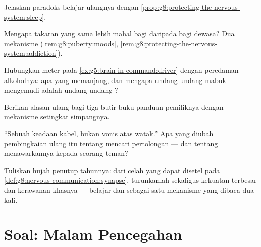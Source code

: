 \begin{exercise}[$\star\star$]\label{exo:g8:protecting-the-nervous-system:7}
Jelaskan paradoks belajar ulangnya dengan
\cref{prop:g8:protecting-the-nervous-system:sleep}.
\end{exercise}

\begin{exercise}[$\star\star$]\label{exo:g8:protecting-the-nervous-system:8}
Mengapa takaran yang sama lebih mahal bagi  
daripada bagi  dewasa? Dua mekanisme
(\cref{rem:g8:puberty:moods},
\cref{rem:g8:protecting-the-nervous-system:addiction}).
\end{exercise}

\begin{exercise}[$\star\star$]\label{exo:g8:protecting-the-nervous-system:9}
Hubungkan meter pada \cref{ex:g5:brain-in-command:driver}
dengan peredaman alkoholnya: apa yang memanjang, dan mengapa
undang-undang mabuk-mengemudi adalah undang-undang ?
\end{exercise}

\begin{exercise}[$\star\star$]\label{exo:g8:protecting-the-nervous-system:10}
Berikan alasan ulang bagi tiga butir buku panduan pemiliknya
dengan mekanisme setingkat simpangnya.
\end{exercise}

\begin{exercise}[$\star\star$]\label{exo:g8:protecting-the-nervous-system:11}
``Sebuah keadaan kabel, bukan vonis atas watak.'' Apa yang
diubah pembingkaian ulang itu tentang mencari pertolongan
--- dan tentang menawarkannya kepada seorang teman?
\end{exercise}

\begin{exercise}[$\star\star\star$]\label{exo:g8:protecting-the-nervous-system:12}
Tuliskan hujah penutup tahunnya: dari celah yang dapat
disetel pada \cref{def:g8:nervous-communication:synapse},
turunkanlah sekaligus kekuatan terbesar  dan
kerawanan khasnya --- belajar dan  sebagai satu
mekanisme yang dibaca dua kali.
\end{exercise}

\section{Soal: Malam Pencegahan}

